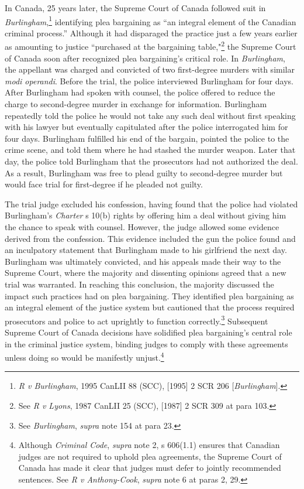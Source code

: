 In Canada, 25 years later, the Supreme Court of Canada followed suit in \textit{Burlingham},\footnote{\textit{R v Burlingham}, 1995 CanLII 88 (SCC), [1995] 2 SCR 206 [\textit{Burlingham}].} identifying plea bargaining as ``an integral element of the Canadian criminal process.'' Although it had disparaged the practice just a few years earlier as amounting to justice ``purchased at the bargaining table,"\footnote{See \textit{R v Lyons}, 1987 CanLII 25 (SCC), [1987] 2 SCR 309 at para 103.} the Supreme Court of Canada soon after recognized plea bargaining's critical role. In \textit{Burlingham}, the appellant was charged and convicted of two first-degree murders with similar \textit{modi operandi}. Before the trial, the police interviewed Burlingham for four days. After Burlingham had spoken with counsel, the police offered to reduce the charge to second-degree murder in exchange for information. Burlingham repeatedly told the police he would not take any such deal without first speaking with his lawyer but eventually capitulated after the police interrogated him for four days. Burlingham fulfilled his end of the bargain, pointed the police to the crime scene, and told them where he had stashed the murder weapon. Later that day, the police told Burlingham that the prosecutors had not authorized the deal. As a result, Burlingham was free to plead guilty to second-degree murder but would face trial for first-degree if he pleaded not guilty.

The trial judge excluded his confession, having found that the police had violated Burlingham's \textit{Charter} s 10(b) rights by offering him a deal without giving him the chance to speak with counsel. However, the judge allowed some evidence derived from the confession. This evidence included the gun the police found and an inculpatory statement that Burlingham made to his girlfriend the next day. Burlingham was ultimately convicted, and his appeals made their way to the Supreme Court, where the majority and dissenting opinions agreed that a new trial was warranted. In reaching this conclusion, the majority discussed the impact such practices had on plea bargaining. They identified plea bargaining as an integral element of the justice system but cautioned that the process required prosecutors and police to act uprightly to function correctly.\footnote{See \textit{Burlingham}, \textit{supra} note 154 at para 23.} Subsequent Supreme Court of Canada decisions have solidified plea bargaining's central role in the criminal justice system, binding judges to comply with these agreements unless doing so would be manifestly unjust.\footnote{Although \textit{Criminal Code}, \textit{supra} note 2, s 606(1.1) ensures that Canadian judges are not required to uphold plea agreements, the Supreme Court of Canada has made it clear that judges must defer to jointly recommended sentences. See \textit{R v Anthony-Cook}, \textit{supra} note 6 at paras 2, 29.}

